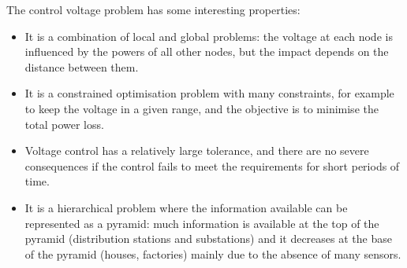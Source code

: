 \noindent The control voltage problem has some interesting properties:
\begin{itemize}
    \item It is a combination of local and global problems: the voltage at each node is influenced by the powers of all other nodes, but the impact depends on the distance between them.
    
    \item It is a constrained optimisation problem with many constraints, for example to keep the voltage in a given range, and the objective is to minimise the total power loss.
    
    \item Voltage control has a relatively large tolerance, and there are no severe consequences if the control fails to meet the requirements for short periods of time. \cite{wang2022multiagent}
    
    \item It is a hierarchical problem where the information available can be represented as a pyramid: much information is available at the top of the pyramid (distribution stations and substations) and it decreases at the base of the pyramid (houses, factories) mainly due to the absence of many sensors.
\end{itemize}



